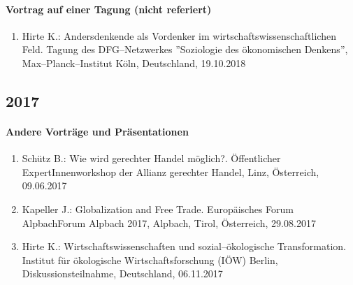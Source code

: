 \paragraph{Vortrag auf einer Tagung (nicht referiert)}
\begin{enumerate}
	\item Hirte K.: Andersdenkende als Vordenker im wirtschaftswissenschaftlichen Feld. Tagung des DFG--Netzwerkes ''Soziologie des ökonomischen Denkens'', Max--Planck--Institut Köln, Deutschland, 19.10.2018
\end{enumerate}
\subsection*{2017}
\paragraph{Andere Vorträge und Präsentationen}
\begin{enumerate}
	\item Schütz B.: Wie wird gerechter Handel möglich?. Öffentlicher ExpertInnenworkshop der Allianz gerechter Handel, Linz, Österreich, 09.06.2017
	\item Kapeller J.: Globalization and Free Trade. Europäisches Forum AlpbachForum Alpbach 2017, Alpbach, Tirol, Österreich, 29.08.2017
	\item Hirte K.: Wirtschaftswissenschaften und sozial--ökologische Transformation. Institut für ökologische Wirtschaftsforschung (IÖW) Berlin, Diskussionsteilnahme, Deutschland, 06.11.2017
\end{enumerate}
